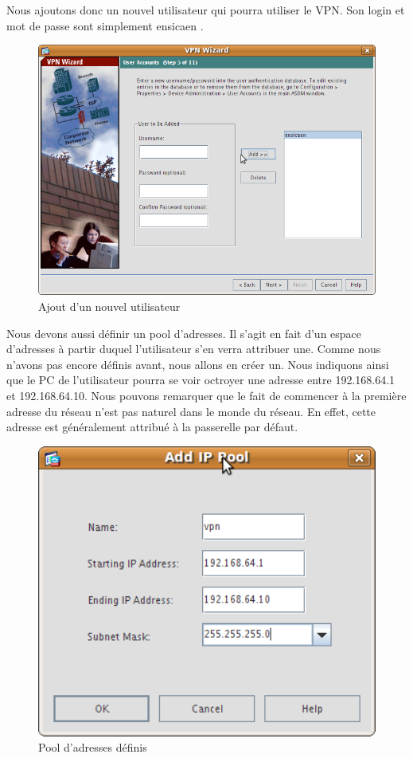 \documentclass[a4paper,12pt]{article}
\begin{document}
Nous ajoutons donc un nouvel utilisateur qui pourra utiliser le VPN. Son login et mot de passe sont simplement \og ensicaen \fg.
\begin{figure}[H]
	\center
	\includegraphics[width=12cm]{img/vpn5.png}
	\caption{Ajout d'un nouvel utilisateur}
\end{figure}

Nous devons aussi définir un pool d'adresses. Il s'agit en fait d'un espace d'adresses à partir duquel l'utilisateur s'en verra attribuer une.
Comme nous n'avons pas encore définis avant, nous allons en créer un. Nous indiquons ainsi que le PC de l'utilisateur pourra se voir octroyer une
adresse entre 192.168.64.1 et 192.168.64.10. Nous pouvons remarquer que le fait de commencer à la première adresse du réseau n'est pas naturel dans le 
monde du réseau. En effet, cette adresse est généralement attribué à la passerelle par défaut.
\begin{figure}[H]
	\center
	\includegraphics[width=12cm]{img/vpn_pool.png}
	\caption{Pool d'adresses définis}
\end{figure}
\end{document}

